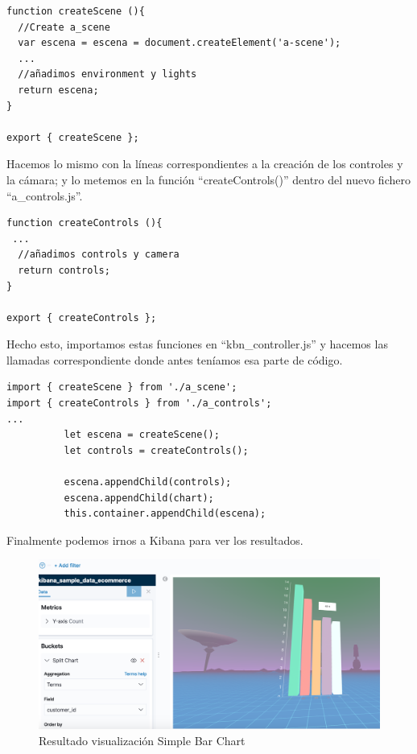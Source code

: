 \documentclass[a4paper, 12pt]{book}
\begin{document}
\begin{lstlisting}[frame=single]
function createScene (){
  //Create a_scene
  var escena = escena = document.createElement('a-scene');
  ...
  //añadimos environment y lights
  return escena;
}

export { createScene };
\end{lstlisting}

Hacemos lo mismo con la líneas correspondientes a la creación de los controles y la cámara; y lo metemos en la función “createControls()” dentro del nuevo fichero “a\_controls.js”.

\begin{lstlisting}[frame=single]
function createControls (){
 ...
  //añadimos controls y camera
  return controls;
}

export { createControls };
\end{lstlisting}

Hecho esto, importamos estas funciones en “kbn\_controller.js” y hacemos las llamadas correspondiente donde antes teníamos esa parte de código.

\begin{lstlisting}[frame=single]
import { createScene } from './a_scene';
import { createControls } from './a_controls';
...
          let escena = createScene();
          let controls = createControls();

          escena.appendChild(controls);
          escena.appendChild(chart);
          this.container.appendChild(escena);
\end{lstlisting}

Finalmente podemos irnos a Kibana para ver los resultados.

\begin{figure}[H]
  \centering
  \includegraphics[width=12cm, keepaspectratio]{img/development/barchart.png}
  \caption{Resultado visualización Simple Bar Chart}
  \label{fig:simplebarchart}
\end{figure}
\end{document}
